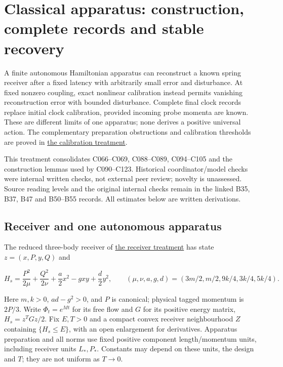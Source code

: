\documentclass[11pt,a4paper]{article}
\begin{document}
\hypertarget{classical-apparatus-construction-complete-records-and-stable-recovery}{%
\section{Classical apparatus: construction, complete records and stable
recovery}\label{classical-apparatus-construction-complete-records-and-stable-recovery}}

A finite autonomous Hamiltonian apparatus can reconstruct a known spring
receiver after a fixed latency with arbitrarily small error and
disturbance. At fixed nonzero coupling, exact nonlinear calibration
instead permits vanishing reconstruction error with bounded disturbance.
Complete final clock records replace initial clock calibration, provided
incoming probe momenta are known. These are different limits of one
apparatus; none derives a positive universal action. The complementary
preparation obstructions and calibration thresholds are proved in
\href{calibration-tolerance-recovery.md}{the calibration treatment}.

This treatment consolidates C066--C069, C088--C089, C094--C105 and the
construction lemmas used by C090--C123. Historical coordinator/model
checks were internal written checks, not external peer review; novelty
is unassessed. Source reading levels and the original internal checks
remain in the linked B35, B37, B47 and B50--B55 records. All estimates
below are written derivations.

\hypertarget{receiver-and-one-autonomous-apparatus}{%
\subsection{Receiver and one autonomous
apparatus}\label{receiver-and-one-autonomous-apparatus}}

The reduced three-body receiver of
\href{conservative-harmonic-receiver.md\#9-a-third-body-exact-memory-and-recoverable-history}{the
receiver treatment} has state \(z=(x,P,y,Q)\) and

\[H_s=\frac{P^2}{2\mu}+\frac{Q^2}{2\nu}
 +\frac a2x^2-gxy+\frac d2y^2,\qquad
(\mu,\nu,a,g,d)=(3m/2,m/2,9k/4,3k/4,5k/4).\]

Here \(m,k>0\), \(ad-g^2>0\), and \(P\) is canonical; physical tagged
momentum is \(2P/3\). Write \(\Phi_t=e^{Mt}\) for its free flow and
\(G\) for its positive energy matrix, \(H_s=z^TGz/2\). Fix \(E,T>0\) and
a compact convex receiver neighbourhood \(Z\) containing
\(\{H_s\le E\}\), with an open enlargement for derivatives. Apparatus
preparation and all norms use fixed positive component length/momentum
units, including receiver units \(L_*,P_*\). Constants may depend on
these units, the design and \(T\); they are not uniform as \(T\to0\).
\end{document}
